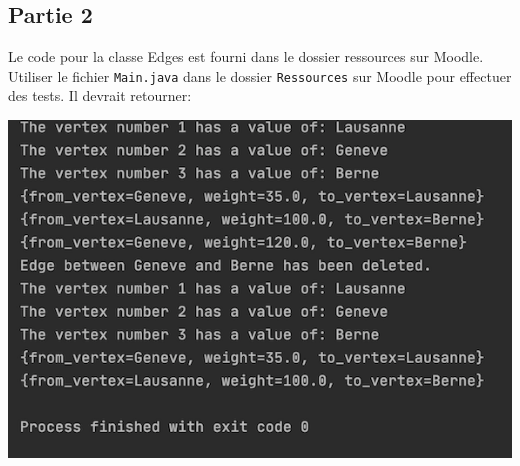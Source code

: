 \subsection{Partie 2}
Le code pour la classe Edges est fourni dans le dossier ressources sur Moodle.
Utiliser le fichier \lstinline{Main.java} dans le dossier \lstinline{Ressources} sur Moodle pour effectuer des tests. Il devrait retourner:

\includegraphics[]{ressources/sortie_juste.PNG}

